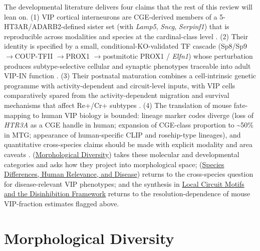 \documentclass[11pt]{article}
\let\origrightarrow\rightarrow
\def\rightarrow{\ensuremath{\origrightarrow}}
\begin{document}
The developmental literature delivers four claims that the rest of this review will lean on. (1) VIP cortical interneurons are CGE-derived members of a 5-HT3AR/ADARB2-defined sister set (with \textit{Lamp5}, \textit{Sncg}, \textit{Serpinf1}) that is reproducible across modalities and species at the cardinal-class level \citep{Lee2010, Miyoshi2010, Tasic2018, Hodge2019}. (2) Their identity is specified by a small, conditional-KO-validated TF cascade (Sp8/Sp9 \rightarrow COUP-TFII \rightarrow PROX1 \rightarrow postmitotic PROX1 / \textit{Elfn1}) whose perturbation produces subtype-selective cellular and synaptic phenotypes traceable into adult VIP-IN function \citep{Wei2019, Kanatani2008, Miyoshi2015, Stachniak2021}. (3) Their postnatal maturation combines a cell-intrinsic genetic programme with activity-dependent and circuit-level inputs, with VIP cells comparatively spared from the activity-dependent migration and survival mechanisms that affect Re+/Cr+ subtypes \citep{Demarcogarcia2011, Karayannis2012, Priya2018, Akgul2019, Lim2018, Demarcogarcia2025}. (4) The translation of mouse fate-mapping to human VIP biology is bounded: lineage marker codes diverge (loss of \textit{HTR3A} as a CGE handle in human; expansion of CGE-class proportion to {\textasciitilde}50\% in MTG; appearance of human-specific CLIP and rosehip-type lineages), and quantitative cross-species claims should be made with explicit modality and area caveats \citep{Hodge2019, Hansen2013, Reinchisi2012, Eichmuller2022, Marin2025}. (\href{/morphology}{Morphological Diversity}) takes these molecular and developmental categories and asks how they project into morphological space; (\href{/disease-translational}{Species Differences, Human Relevance, and Disease}) returns to the cross-species question for disease-relevant VIP phenotypes; and the synthesis in \href{/disinhibition-framework}{Local Circuit Motifs and the Disinhibition Framework} returns to the resolution-dependence of mouse VIP-fraction estimates flagged above.


\section{Morphological Diversity}
\label{sec:04_morphology}
\end{document}
